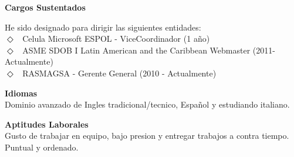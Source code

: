 {\bf Cargos Sustentados}

\hspace{.3in}  He sido designado para dirigir las siguientes entidades:\\
\hspace{.3in}  $\Diamond$~ Celula Microsoft ESPOL - ViceCoordinador (1 a\~{n}o)\\
\hspace{.3in}  $\Diamond$~ ASME SDOB I Latin American and the Caribbean Webmaster (2011-Actualmente)\\
\hspace{.3in}  $\Diamond$~ RASMAGSA - Gerente General  (2010 - Actualmente)


{\bf Idiomas}\\
\hspace{.3in} Dominio avanzado de Ingles tradicional/tecnico, Espa\~{n}ol y estudiando italiano.

{\bf Aptitudes Laborales}\\
\hspace{.3in}  Gusto de trabajar en equipo, bajo presion y entregar trabajos a contra tiempo. Puntual y ordenado. 




\bye
